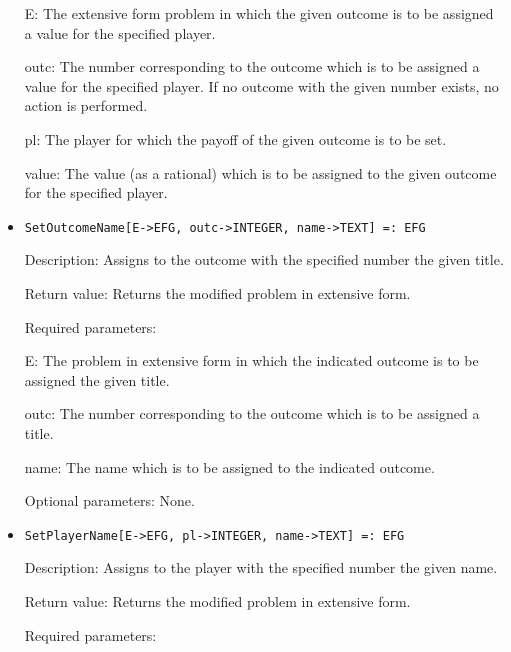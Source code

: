 \begin{itemize}
\bd
\item
[E:] The extensive form problem in which the given outcome is to be
assigned a value for the specified player.
\item
[outc:] The number corresponding to the outcome which is to be
assigned a value for the specified player.  If no outcome with the
given number exists, no action is performed.
\item
[pl:] The player for which the payoff of the given outcome is to be
set.
\item
[value:] The value (as a rational) which is to be assigned to the
given outcome for the specified player.
\ed
\ed

\item

\protect \large \begin{verbatim}
SetOutcomeName[E->EFG, outc->INTEGER, name->TEXT] =: EFG
\end{verbatim}\normalsize

\bd
\item
[Description:] Assigns to the outcome with the specified number the
given title.
\item
[Return value:] Returns the modified problem in extensive form.
\item
[Required parameters:]\hfil\null
	
\bd
\item
[E:] The problem in extensive form in which the indicated outcome is
to be assigned the given title.
\item
[outc:] The number corresponding to the outcome which is to be
assigned a title.
\item
[name:] The name which is to be assigned to the indicated outcome.
\ed

\item
[Optional parameters:] None.
\ed

\item

\protect \large \begin{verbatim}
SetPlayerName[E->EFG, pl->INTEGER, name->TEXT] =: EFG
\end{verbatim}\normalsize

\bd
\item
[Description:] Assigns to the player with the specified number the
given name.
\item
[Return value:] Returns the modified problem in extensive form.
\item
[Required parameters:]\hfil\null


\end{itemize}
